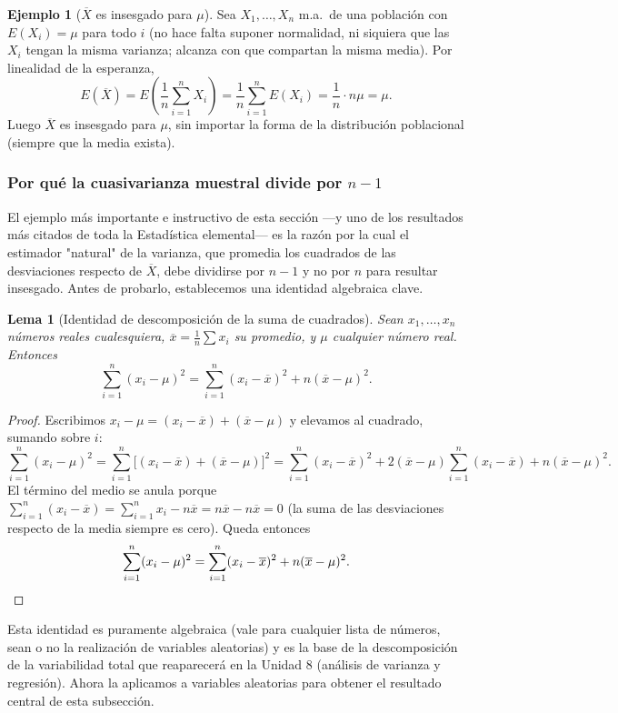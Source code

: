 \documentclass[11pt,a4paper]{article}
\theoremstyle{plain}
\newtheorem{lema}[teorema]{Lema}
\theoremstyle{definition}
\newtheorem{ejemplo}[teorema]{Ejemplo}
\theoremstyle{remark}
\begin{document}
\begin{ejemplo}[$\overline X$ es insesgado para $\mu$]
Sea $X_1,\dots,X_n$ m.a.\ de una población con $E(X_i)=\mu$ para todo $i$ (no hace falta suponer normalidad, ni siquiera que las $X_i$ tengan la misma varianza; alcanza con que compartan la misma media). Por linealidad de la esperanza,
\[
E(\overline X) = E\left(\frac1n\sum_{i=1}^n X_i\right) = \frac1n\sum_{i=1}^n E(X_i) = \frac1n\cdot n\mu = \mu.
\]
Luego $\overline X$ es insesgado para $\mu$, sin importar la forma de la distribución poblacional (siempre que la media exista).
\end{ejemplo}

\subsubsection*{Por qué la cuasivarianza muestral divide por $n-1$}

El ejemplo más importante e instructivo de esta sección —y uno de los resultados más citados de toda la Estadística elemental— es la razón por la cual el estimador "natural" de la varianza, que promedia los cuadrados de las desviaciones respecto de $\overline X$, debe dividirse por $n-1$ y no por $n$ para resultar insesgado. Antes de probarlo, establecemos una identidad algebraica clave.

\begin{lema}[Identidad de descomposición de la suma de cuadrados]\label{lema:descomp}
Sean $x_1,\dots,x_n$ números reales cualesquiera, $\overline x = \frac1n\sum x_i$ su promedio, y $\mu$ cualquier número real. Entonces
\[
\sum_{i=1}^n (x_i-\mu)^2 = \sum_{i=1}^n (x_i-\overline x)^2 + n(\overline x-\mu)^2.
\]
\end{lema}

\begin{proof}
Escribimos $x_i - \mu = (x_i-\overline x) + (\overline x-\mu)$ y elevamos al cuadrado, sumando sobre $i$:
\[
\sum_{i=1}^n (x_i-\mu)^2 = \sum_{i=1}^n \Big[(x_i-\overline x)+(\overline x-\mu)\Big]^2 = \sum_{i=1}^n (x_i-\overline x)^2 + 2(\overline x-\mu)\sum_{i=1}^n (x_i-\overline x) + n(\overline x-\mu)^2.
\]
El término del medio se anula porque $\sum_{i=1}^n (x_i-\overline x) = \sum_{i=1}^n x_i - n\overline x = n\overline x - n\overline x = 0$ (la suma de las desviaciones respecto de la media siempre es cero). Queda entonces
\[
\sum_{i=1}^n (x_i-\mu)^2 = \sum_{i=1}^n (x_i-\overline x)^2 + n(\overline x-\mu)^2. \qedhere
\]
\end{proof}

Esta identidad es puramente algebraica (vale para cualquier lista de números, sean o no la realización de variables aleatorias) y es la base de la descomposición de la variabilidad total que reaparecerá en la Unidad 8 (análisis de varianza y regresión). Ahora la aplicamos a variables aleatorias para obtener el resultado central de esta subsección.
\end{document}
